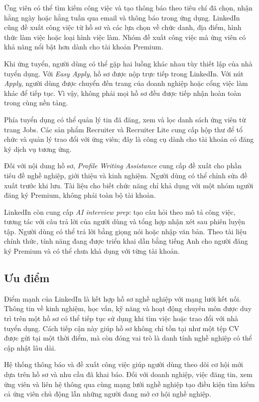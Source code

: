 Ứng viên có thể tìm kiếm công việc và tạo thông báo theo tiêu chí đã chọn, nhận hằng ngày hoặc hằng tuần qua email và thông báo trong ứng dụng. LinkedIn cũng đề xuất công việc từ hồ sơ và các lựa chọn về chức danh, địa điểm, hình thức làm việc hoặc loại hình việc làm. Nhóm đề xuất công việc mà ứng viên có khả năng nổi bật hơn dành cho tài khoản Premium.

Khi ứng tuyển, người dùng có thể gặp hai luồng khác nhau tùy thiết lập của nhà tuyển dụng. Với \textit{Easy Apply}, hồ sơ được nộp trực tiếp trong LinkedIn. Với nút \textit{Apply}, người dùng được chuyển đến trang của doanh nghiệp hoặc cổng việc làm khác để tiếp tục. Vì vậy, không phải mọi hồ sơ đều được tiếp nhận hoàn toàn trong cùng nền tảng.

Phía tuyển dụng có thể quản lý tin đã đăng, xem và lọc danh sách ứng viên từ trang Jobs. Các sản phẩm Recruiter và Recruiter Lite cung cấp hộp thư để tổ chức và quản lý trao đổi với ứng viên; đây là công cụ dành cho tài khoản có đăng ký dịch vụ tương ứng.

Đối với nội dung hồ sơ, \textit{Profile Writing Assistance} cung cấp đề xuất cho phần tiêu đề nghề nghiệp, giới thiệu và kinh nghiệm. Người dùng có thể chỉnh sửa đề xuất trước khi lưu. Tài liệu cho biết chức năng chỉ khả dụng với một nhóm người đăng ký Premium, không phải toàn bộ tài khoản.

LinkedIn còn cung cấp \textit{AI interview prep}: tạo câu hỏi theo mô tả công việc, tương tác với câu trả lời của người dùng và tổng hợp nhận xét sau phiên luyện tập. Người dùng có thể trả lời bằng giọng nói hoặc nhập văn bản. Theo tài liệu chính thức, tính năng đang được triển khai dần bằng tiếng Anh cho người đăng ký Premium và có thể chưa khả dụng với từng tài khoản.

\subsection{Ưu điểm}

Điểm mạnh của LinkedIn là kết hợp hồ sơ nghề nghiệp với mạng lưới kết nối. Thông tin về kinh nghiệm, học vấn, kỹ năng và hoạt động chuyên môn được duy trì trên một hồ sơ có thể tiếp tục sử dụng khi tìm việc hoặc trao đổi với nhà tuyển dụng. Cách tiếp cận này giúp hồ sơ không chỉ tồn tại như một tệp CV được gửi tại một thời điểm, mà còn đóng vai trò là danh tính nghề nghiệp có thể cập nhật lâu dài.

Hệ thống thông báo và đề xuất công việc giúp người dùng theo dõi cơ hội mới dựa trên hồ sơ và nhu cầu đã khai báo. Đối với doanh nghiệp, việc đăng tin, xem ứng viên và liên hệ thông qua cùng mạng lưới nghề nghiệp tạo điều kiện tìm kiếm cả ứng viên chủ động lẫn những người đang mở cơ hội nghề nghiệp.


